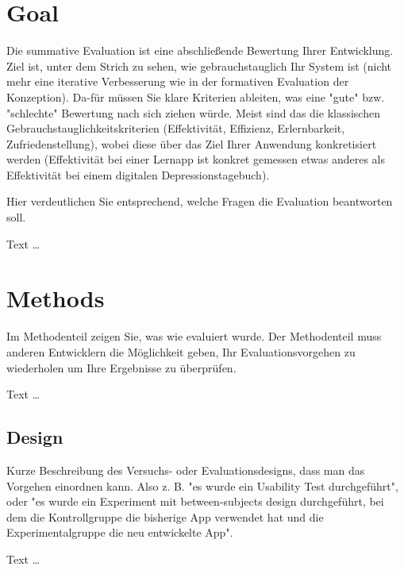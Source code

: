 \documentclass[11pt,a4paper,english]{scrreprt}
\newenvironment{comment}
  {\par\medskip
   \begingroup\color{olive}%
   }
 {\endgroup
  \medskip}
\begin{document}
\section{Goal}
\begin{comment}
Die summative Evaluation ist eine abschließende Bewertung Ihrer Entwicklung. Ziel ist, unter dem Strich zu sehen, wie gebrauchstauglich Ihr System ist (nicht mehr eine iterative Verbesserung wie in der formativen Evaluation der Konzeption). Da-für müssen Sie klare Kriterien ableiten, was eine "gute" bzw. "schlechte" Bewertung nach sich ziehen würde. Meist sind das die klassischen Gebrauchstauglichkeitskriterien (Effektivität, Effizienz, Erlernbarkeit, Zufriedenstellung), wobei diese über das Ziel Ihrer Anwendung konkretisiert werden (Effektivität bei einer Lernapp ist konkret gemessen etwas anderes als Effektivität bei einem digitalen Depressionstagebuch).

Hier verdeutlichen Sie entsprechend, welche Fragen die Evaluation beantworten soll.
\end{comment}

Text \dots

\section{Methods}
\begin{comment}
Im Methodenteil zeigen Sie, was wie evaluiert wurde. Der Methodenteil muss anderen Entwicklern die Möglichkeit geben, Ihr Evaluationsvorgehen zu wiederholen um Ihre Ergebnisse zu überprüfen. 
\end{comment}

Text \dots

\subsection{Design}
\begin{comment}
Kurze Beschreibung des Versuchs- oder Evaluationsdesigns, dass man das Vorgehen einordnen kann. Also z. B. "es wurde ein Usability Test durchgeführt", oder "es wurde ein Experiment mit between-subjects design durchgeführt, bei dem die Kontrollgruppe die bisherige App verwendet hat und die Experimentalgruppe die neu entwickelte App".
\end{comment}

Text \dots
\end{document}
